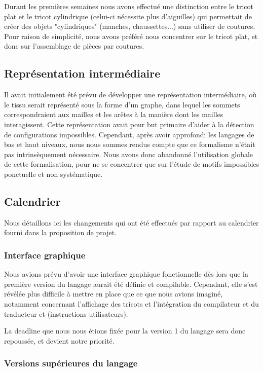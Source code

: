 \documentclass{article}
\begin{document}
Durant les premières semaines nous avons effectué une distinction entre le tricot plat et le tricot cylindrique (celui-ci nécessite plus d'aiguilles) qui permettait de créer des objets "cylindriques" (manches, chaussettes...) sans utiliser de coutures. Pour raison de simplicité, nous avons préféré nous concentrer sur le tricot plat, et donc sur l'assemblage de pièces par coutures.

\subsection{Représentation intermédiaire} 

Il avait initialement été prévu de développer une représentation intermédiaire, où le tissu serait représenté sous la forme d'un graphe,
dans lequel les sommets correspondraient aux mailles et les arêtes à la manière dont les mailles interagissent. Cette représentation avait
pour but primaire d'aider à la détection de configurations impossibles. Cependant, après avoir approfondi les langages de bas et haut
niveaux, nous nous sommes rendus compte que ce formalisme n'était pas intrinsèquement nécessaire. %
Nous avons donc abandonné l'utilisation globale de cette formalisation, pour ne se concentrer que sur l'étude de motifs impossibles
ponctuelle et non systématique.

\subsection{Calendrier}

Nous détaillons ici les changements qui ont été effectués par rapport au calendrier fourni dans la proposition de projet.

\subsubsection{Interface graphique}

Nous avions prévu d'avoir une interface graphique fonctionnelle dès lors que la première version du langage aurait été définie et compilable.  
Cependant, elle s'est révélée plus difficile à mettre en place que ce que nous avions imaginé, notamment concernant l'affichage des tricots et l'intégration du compilateur et du traducteur et (instructions utilisateurs).

La deadline que nous nous étions fixée pour la version 1 du langage sera donc repoussée, et devient notre priorité.

\subsubsection{Versions supérieures du langage}
\end{document}
